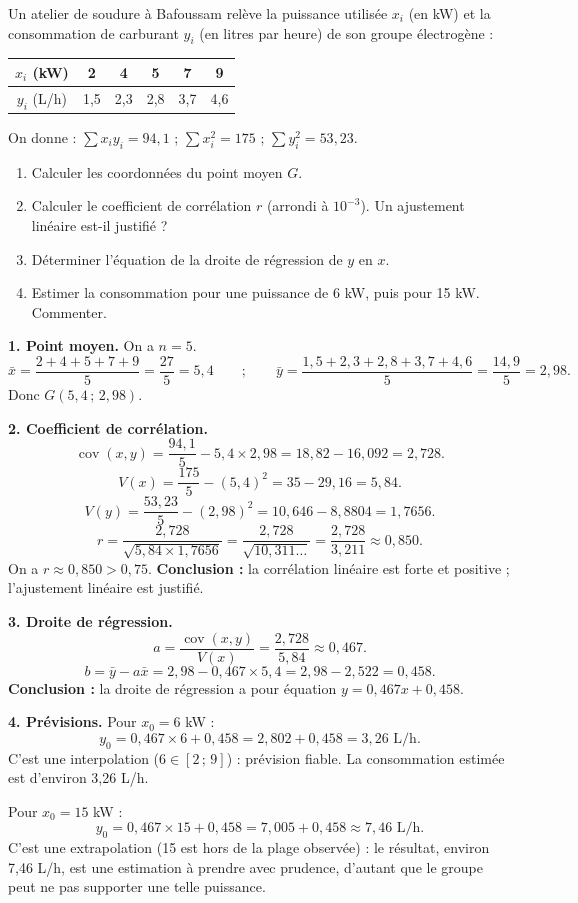 \documentclass[11pt]{article}
\begin{document}
\begin{exoresolu}
Un atelier de soudure à Bafoussam relève la puissance utilisée $x_i$ (en kW) et la consommation de carburant $y_i$ (en litres par heure) de son groupe électrogène :
\begin{center}
\begin{tabular}{|c|ccccc|}
\hline
\rowcolor{popblueL} $x_i$ (kW) & 2 & 4 & 5 & 7 & 9 \\
\hline
$y_i$ (L/h) & 1{,}5 & 2{,}3 & 2{,}8 & 3{,}7 & 4{,}6 \\
\hline
\end{tabular}
\end{center}
On donne : $\sum x_i y_i = 94{,}1$ ; $\sum x_i^2 = 175$ ; $\sum y_i^2 = 53{,}23$.
\begin{enumerate}
\item Calculer les coordonnées du point moyen $G$.
\item Calculer le coefficient de corrélation $r$ (arrondi à $10^{-3}$). Un ajustement linéaire est-il justifié ?
\item Déterminer l'équation de la droite de régression de $y$ en $x$.
\item Estimer la consommation pour une puissance de 6 kW, puis pour 15 kW. Commenter.
\end{enumerate}
\tcblower
\textbf{1. Point moyen.} On a $n = 5$.
\[ \bar{x} = \frac{2+4+5+7+9}{5} = \frac{27}{5} = 5{,}4 \qquad ; \qquad \bar{y} = \frac{1{,}5+2{,}3+2{,}8+3{,}7+4{,}6}{5} = \frac{14{,}9}{5} = 2{,}98. \]
Donc $G(5{,}4\,;\,2{,}98)$.

\textbf{2. Coefficient de corrélation.}
\[ \operatorname{cov}(x,y) = \frac{94{,}1}{5} - 5{,}4 \times 2{,}98 = 18{,}82 - 16{,}092 = 2{,}728. \]
\[ V(x) = \frac{175}{5} - (5{,}4)^2 = 35 - 29{,}16 = 5{,}84. \]
\[ V(y) = \frac{53{,}23}{5} - (2{,}98)^2 = 10{,}646 - 8{,}8804 = 1{,}7656. \]
\[ r = \frac{2{,}728}{\sqrt{5{,}84 \times 1{,}7656}} = \frac{2{,}728}{\sqrt{10{,}311\ldots}} = \frac{2{,}728}{3{,}211} \approx 0{,}850. \]
On a $r \approx 0{,}850 > 0{,}75$.
\textbf{Conclusion :} la corrélation linéaire est forte et positive ; l'ajustement linéaire est justifié.

\textbf{3. Droite de régression.}
\[ a = \frac{\operatorname{cov}(x,y)}{V(x)} = \frac{2{,}728}{5{,}84} \approx 0{,}467. \]
\[ b = \bar{y} - a\bar{x} = 2{,}98 - 0{,}467 \times 5{,}4 = 2{,}98 - 2{,}522 = 0{,}458. \]
\textbf{Conclusion :} la droite de régression a pour équation $y = 0{,}467x + 0{,}458$.

\textbf{4. Prévisions.}
Pour $x_0 = 6$ kW :
\[ y_0 = 0{,}467 \times 6 + 0{,}458 = 2{,}802 + 0{,}458 = 3{,}26 \text{ L/h}. \]
C'est une interpolation ($6 \in [2\,;\,9]$) : prévision fiable. La consommation estimée est d'environ 3,26 L/h.

Pour $x_0 = 15$ kW :
\[ y_0 = 0{,}467 \times 15 + 0{,}458 = 7{,}005 + 0{,}458 \approx 7{,}46 \text{ L/h}. \]
C'est une extrapolation (15 est hors de la plage observée) : le résultat, environ 7,46 L/h, est une estimation à prendre avec prudence, d'autant que le groupe peut ne pas supporter une telle puissance.
\end{exoresolu}
\end{document}
